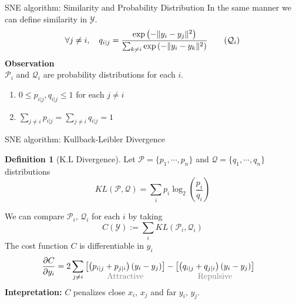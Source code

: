 \documentclass[10pt]{beamer}
\theoremstyle{definition}
\newtheorem{defn}{Definition}
\newcommand{\1}{\mathbbm{1}}
\newcommand{\YY}{\mathcal{Y}}
\newcommand{\PP}{\mathcal{P}}
\newcommand{\QQ}{\mathcal{Q}}
\begin{document}
\begin{frame}{SNE algorithm: Similarity and Probability Distribution}
  In the same manner we can define similarity in $\YY$.
  \begin{equation}
      \forall j\ne i,\quad q_{i|j}  = \frac{\exp\left(-\|y_i -
    y_j\|^2\right)}{\sum_{k\ne i}\exp\left(-\|y_i - y_k\|^2\right)}
    \tag{$\QQ_i$}
  \end{equation}
  \vfill
  {\bf Observation}\\
  $\PP_i$ and $\QQ_i$ are probability distributions  for each $i$.
  \begin{enumerate}
  \item $0 \le p_{i|j},q_{i|j} \le 1$ for each $j\ne i$
  \item $\sum_{j\ne i} p_{i|j} = \sum_{j\ne i} q_{i|j} = 1 $
\end{enumerate}
\end{frame}
\begin{frame}{SNE algorithm: Kullback-Leibler Divergence}{}
  \begin{defn}[K.L Divergence]
    \vspace{1px}
    Let $ \PP=\{p_1, \cdots, p_n\}$ and $\QQ=\{q_1,\cdots,q_n\}$  distributions
    \begin{equation}
      KL(\PP,\QQ) = \sum_i p_i\log_2\left( \frac{p_i}{q_i} \right)
    \end{equation}
  \end{defn}
  We can compare $\PP_i,\,\QQ_i$ for each $i$ by taking
  \begin{equation}
   C(\YY) := \sum_i KL(\PP_i,\QQ_i)
  \end{equation}
   The cost function $C$ is differentiable in $y_i$
  \begin{equation}
    \begin{aligned}
      \frac{\partial C}{\partial y_i} %
      &= 2\sum_{j\ne i} \underset{\mbox{\color{grey}Attractive}}{\left[\left( p_{i|j} + p_{j|i}
      \right)(y_i-y_j)\right]} - \underset{\mbox{\color{grey}Repulsive}}{\left[
          \left( q_{i|j}+q_{j|i}\right)\left( y_i-y_j \right)\right]}
    \end{aligned}
  \end{equation}
  {\bf Intepretation:} $C$ penalizes close $x_i,\,x_j$ and far $y_i,\,y_j$.
\end{frame}
\end{document}
